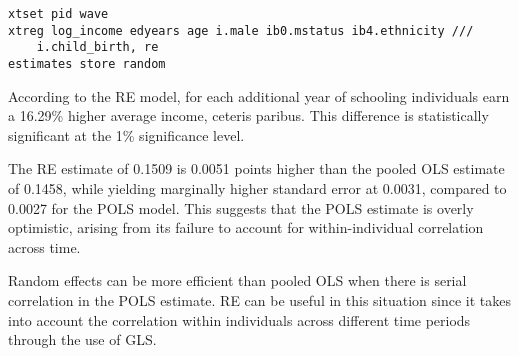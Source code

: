 


\begin{verbatim}
xtset pid wave
xtreg log_income edyears age i.male ib0.mstatus ib4.ethnicity ///
    i.child_birth, re
estimates store random
\end{verbatim}


According to the RE model, for each additional year of schooling individuals earn a 16.29\% higher average income, ceteris paribus. This difference is statistically significant at the 1\% significance level.

The RE estimate of 0.1509 is 0.0051 points higher than the pooled OLS estimate of 0.1458, while yielding marginally higher standard error at 0.0031, compared to 0.0027 for the POLS model. This suggests that the POLS estimate is overly optimistic, arising from its failure to account for within-individual correlation across time.


\newpage


Random effects can be more efficient than pooled OLS when there is serial correlation in the POLS estimate. RE can be useful in this situation since it takes into account the correlation within individuals across different time periods through the use of GLS.